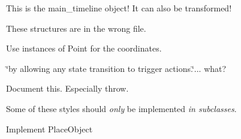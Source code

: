 \begin{DoxyRefList}
\item[\label{todo__todo000010}%
\hypertarget{todo__todo000010}{}%
Member \hyperlink{classjswf_1_1flash_1_1_document_a2b85a878280ace8647cb05fdfd79e22a}{jswf\+:\+:flash\+:\+:Document\+:\+:root\+Sprite} ]This is the main\+\_\+timeline object! It can also be transformed!  
\item[\label{todo__todo000013}%
\hypertarget{todo__todo000013}{}%
Class \hyperlink{structjswf_1_1flash_1_1_matrix}{jswf\+:\+:flash\+:\+:Matrix} ]These structures are in the wrong file.  
\item[\label{todo__todo000012}%
\hypertarget{todo__todo000012}{}%
Class \hyperlink{structjswf_1_1flash_1_1_segment}{jswf\+:\+:flash\+:\+:Segment} ]Use instances of Point for the coordinates.  
\item[\label{todo__todo000014}%
\hypertarget{todo__todo000014}{}%
Class \hyperlink{classjswf_1_1flash_1_1tags_1_1_define_button2_tag}{jswf\+:\+:flash\+:\+:tags\+:\+:Define\+Button2\+Tag} ]\char`\"{}by allowing any state transition to trigger actions.\char`\"{}... what?  
\item[\label{todo__todo000015}%
\hypertarget{todo__todo000015}{}%
Member \hyperlink{classjswf_1_1flash_1_1tags_1_1_define_shape2_tag_a1a6b796a542d30359ee662b68f13c208}{jswf\+:\+:flash\+:\+:tags\+:\+:Define\+Shape2\+Tag\+:\+:read\+Array\+Count} ()]Document this. Especially throw.  
\item[\label{todo__todo000016}%
\hypertarget{todo__todo000016}{}%
Member \hyperlink{classjswf_1_1flash_1_1tags_1_1_define_shape_tag_a4608b4e2716301637136fbbd1c5040ab}{jswf\+:\+:flash\+:\+:tags\+:\+:Define\+Shape\+Tag\+:\+:read\+Fill\+Style} ()]Some of these styles should {\itshape only} be implemented {\itshape in subclasses}.  
\item[\label{todo__todo000017}%
\hypertarget{todo__todo000017}{}%
Class \hyperlink{classjswf_1_1flash_1_1tags_1_1_place_object2_tag}{jswf\+:\+:flash\+:\+:tags\+:\+:Place\+Object2\+Tag} ]Implement {\ttfamily Place\+Object} 


\end{DoxyRefList}
